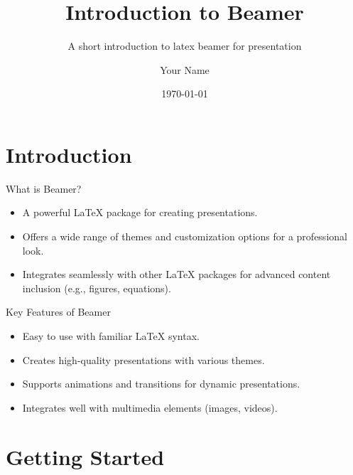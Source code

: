 
\title{Introduction to Beamer}
\subtitle{A short introduction to latex beamer for presentation}
\author{Your Name}
\date{\today}



\maketitle

\section{Introduction}
\begin{frame}
    \sectionpage
\end{frame}

\begin{slide}{What is Beamer?}
    \begin{itemize}
        \item A powerful LaTeX package for creating presentations.
        \item Offers a wide range of themes and customization options for a professional look.
        \item Integrates seamlessly with other LaTeX packages for advanced content inclusion (e.g., figures, equations).
      \end{itemize}
\end{slide}

\begin{slide}{Key Features of Beamer}
    \begin{itemize}
        \item Easy to use with familiar LaTeX syntax.
        \item Creates high-quality presentations with various themes.
        \item Supports animations and transitions for dynamic presentations.
        \item Integrates well with multimedia elements (images, videos).
  \end{itemize}
\end{slide}

\section{Getting Started}
\begin{frame}
    \sectionpage
\end{frame}

